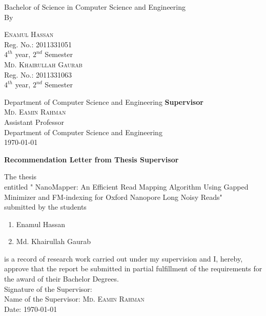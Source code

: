 \documentclass{standalone}
\begin{document}
\begin{titlepage}
\begin{center}
        {\Large Bachelor of Science in Computer Science and Engineering}\\
				\vfill
				{\LARGE By}\\
        \begin{multicols}{2}
        \textsc{\Large Enamul Hassan }\\
        Reg. No.: 2011331051\\ $4^{th}$ year, $2^{nd}$ Semester\\
				\textsc{\Large Md. Khairullah Gaurab} \\
        Reg. No.: 2011331063\\ $4^{th}$ year, $2^{nd}$ Semester\\ 
				\end{multicols}
				Department of Computer Science and Engineering
				\vfill
        {\bf Supervisor}\\
				\textsc{\Large Md. Eamin Rahman} \\
        Assistant Professor\\ 
				Department of Computer Science and Engineering\\
        \vfill
        \today
        \end{center}
				\newpage
				\begin{center}
					\textbf{\huge Recommendation Letter from Thesis Supervisor}
				\end{center}
				\noindent
				The thesis
				\\
				entitled "{ NanoMapper: An Efficient Read Mapping Algorithm Using Gapped Minimizer and FM-indexing for Oxford Nanopore Long Noisy Reads}"
				\\
				submitted by the students
				\begin{enumerate}
					\item Enamul Hassan
					\item Md. Khairullah Gaurab
				\end{enumerate}
				is a record of research work carried out under my supervision and I, hereby, approve that the report be submitted in partial fulfillment of the requirements for the award of their Bachelor Degrees.\\

				\vspace{2.0cm}
				\noindent
				Signature of the Supervisor: \\
				Name of the Supervisor: \textsc{\large Md. Eamin Rahman}\\%
				Date: \today
				

\end{titlepage}
\end{document}
